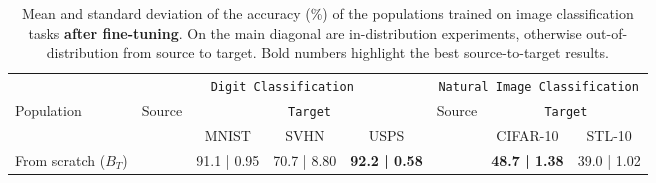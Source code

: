 \begin{table}[t]
\begin{minipage}[t]{0.98\textwidth}
\centering
\caption{\small Mean and standard deviation of the accuracy (\%) of the populations trained on image classification tasks \textbf{after fine-tuning}. On the main diagonal are in-distribution experiments, otherwise out-of-distribution from source to target. 
Bold numbers highlight the best source-to-target results. 
}
\label{tab:accuracies}
{\scriptsize
\setlength{\tabcolsep}{8pt}
\begin{tabular}{lccccccc}
\toprule
 &\multicolumn{4}{c}{\texttt{Digit Classification}} & \multicolumn{3}{c}{\texttt{Natural Image Classification}}  \\
 \cmidrule(r){2-5} \cmidrule(l){6-8}
Population & Source & \multicolumn{3}{c}{\texttt{Target}}  & Source & \multicolumn{2}{c}{\texttt{Target}} \\
\cmidrule(r){1-1} \cmidrule(rl){2-2} \cmidrule(rl){3-5} \cmidrule(rl){6-6}  \cmidrule(l){7-8}
            &                           & MNIST                     & SVHN                     & USPS                       &                            & CIFAR-10                     & STL-10 \\
\cmidrule(rl){3-5}  \cmidrule(l){7-8}
From scratch ($B_T$)      &                           & 91.1 | 0.95               & 70.7 | 8.80              & \textbf{92.2 | 0.58}       &                            & \textbf{48.7 | 1.38} 	    &         39.0 | 1.02 \\

\end{tabular}}
\end{minipage}
\end{table}
